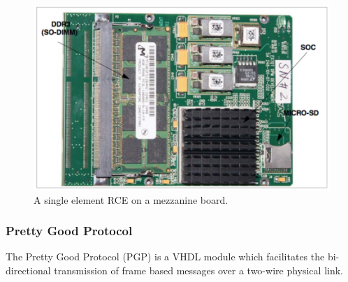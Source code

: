 \begin{figure}[tbh]
\includegraphics[scale=0.8]{mezzanine.pdf}
\caption{A single element RCE on a mezzanine board.}
\label{fig:mezz}
\end{figure} 


\subsubsection{Pretty Good Protocol}

The Pretty Good Protocol (PGP) is a VHDL module which facilitates the bi-directional transmission of frame based messages over a two-wire physical link.      
